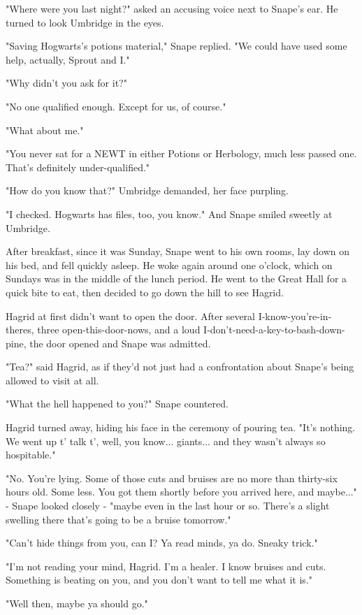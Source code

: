 \documentclass[a4paper,11pt]{article}
\begin{document}
"Where were you last night?" asked an accusing voice next to Snape's ear. He turned to look Umbridge in the eyes.

"Saving Hogwarts's potions material," Snape replied. "We could have used some help, actually, Sprout and I."

"Why didn't you ask for it?"

"No one qualified enough. Except for us, of course."

"What about me."

"You never sat for a NEWT in either Potions or Herbology, much less passed one. That's definitely under-qualified."

"How do you know that?" Umbridge demanded, her face purpling.

"I checked. Hogwarts has files, too, you know." And Snape smiled sweetly at Umbridge.

After breakfast, since it was Sunday, Snape went to his own rooms, lay down on his bed, and fell quickly asleep. He woke again around one o'clock, which on Sundays was in the middle of the lunch period. He went to the Great Hall for a quick bite to eat, then decided to go down the hill to see Hagrid.

Hagrid at first didn't want to open the door. After several I-know-you're-in-theres, three open-this-door-nows, and a loud I-don't-need-a-key-to-bash-down-pine, the door opened and Snape was admitted.

"Tea?" said Hagrid, as if they'd not just had a confrontation about Snape's being allowed to visit at all.

"What the hell happened to you?" Snape countered.

Hagrid turned away, hiding his face in the ceremony of pouring tea. "It's nothing. We went up t' talk t', well, you know... giants... and they wasn't always so hospitable."

"No. You're lying. Some of those cuts and bruises are no more than thirty-six hours old. Some less. You got them shortly before you arrived here, and maybe..." - Snape looked closely - "maybe even in the last hour or so. There's a slight swelling there that's going to be a bruise tomorrow."

"Can't hide things from you, can I? Ya read minds, ya do. Sneaky trick."

"I'm not reading your mind, Hagrid. I'm a healer. I know bruises and cuts. Something is beating on you, and you don't want to tell me what it is."

"Well then, maybe ya should go."
\end{document}
